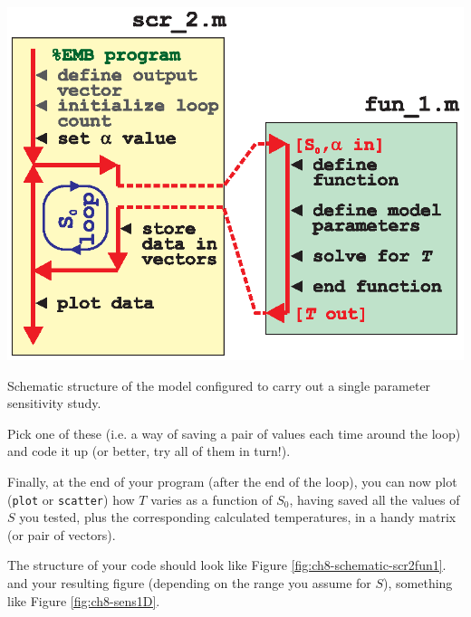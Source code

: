 \documentclass{tufte-book} %
\begin{document}
\begin{marginfigure}[-1.75in]
\includegraphics[width=\linewidth]{ch8-schematic-scr2fun1.eps}
\caption{Schematic structure of the model configured to carry out a single parameter sensitivity study.}
\label{fig:ch8-schematic-scr2fun1}
\end{marginfigure}

Pick one of these (i.e. a way of saving a pair of values each time around the loop) and code it up (or better, try all of them in turn!).

Finally, at the end of your program (after the end of the loop), you can now plot (\texttt{plot} or \texttt{scatter}) how \(T\) varies as a function of \(S_{0}\), having saved all the values of \(S\) you tested, plus the corresponding calculated temperatures, in a handy matrix (or pair of vectors).

The structure of your code should look like Figure \ref{fig:ch8-schematic-scr2fun1}. and your resulting figure (depending on the range you assume for \(S\)), something like Figure \ref{fig:ch8-sens1D}.
\end{document}
